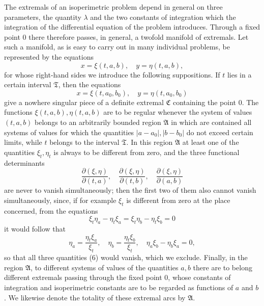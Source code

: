\documentclass[11pt,a4paper,leqno]{article}
\begin{document}
The extremals of an isoperimetric problem depend in general on three parameters, the quantity $\lambda$ and the two constants of integration which the integration of the differential equation of the problem introduces. Through a fixed point 0 there therefore passes, in general, a twofold manifold of extremals. Let such a manifold, as is easy to carry out in many individual problems, be represented by the equations
\[
x=\xi(t,a,b),
\quad
 y=\eta(t,a,b),
\]
for whose right-hand sides we introduce the following suppositions. If $t$ lies in a certain interval $\mathfrak{T}$, then the equations
\[
x=\xi(t,a_0,b_0),
\quad
 y=\eta(t,a_0,b_0)
\]
give a nowhere singular piece of a definite extremal $\mathfrak{C}$ containing the point 0. The functions $\xi(t,a,b),\eta(t,a,b)$ are to be regular whenever the system of values $(t,a,b)$ belongs to an arbitrarily bounded region $\mathfrak{A}$ in which are contained all systems of values for which the quantities $|a-a_0|,|b-b_0|$ do not exceed certain limits, while $t$ belongs to the interval $\mathfrak{T}$. In this region $\mathfrak{A}$ at least one of the quantities $\xi_t,\eta_t$ is always to be different from zero, and the three functional determinants
\begin{equation}\tag{6}
\frac{\partial(\xi,\eta)}{\partial(t,a)},
\quad
\frac{\partial(\xi,\eta)}{\partial(t,b)},
\quad
\frac{\partial(\xi,\eta)}{\partial(a,b)}
\end{equation}
are never to vanish simultaneously; then the first two of them also cannot vanish simultaneously, since, if for example $\xi_t$ is different from zero at the place concerned, from the equations
\[
\xi_t\eta_a-\eta_t\xi_a=\xi_t\eta_b-\eta_t\xi_b=0
\]
it would follow that
\[
\eta_a=\frac{\eta_t\xi_a}{\xi_t},
\quad
\eta_b=\frac{\eta_t\xi_b}{\xi_t},
\quad
\eta_a\xi_b-\eta_b\xi_a=0,
\]
so that all three quantities (6) would vanish, which we exclude. Finally, in the region $\mathfrak{A}$, to different systems of values of the quantities $a,b$ there are to belong different extremals passing through the fixed point 0, whose constants of integration and isoperimetric constants are to be regarded as functions of $a$ and $b$. We likewise denote the totality of these extremal arcs by $\mathfrak{A}$.
\end{document}
